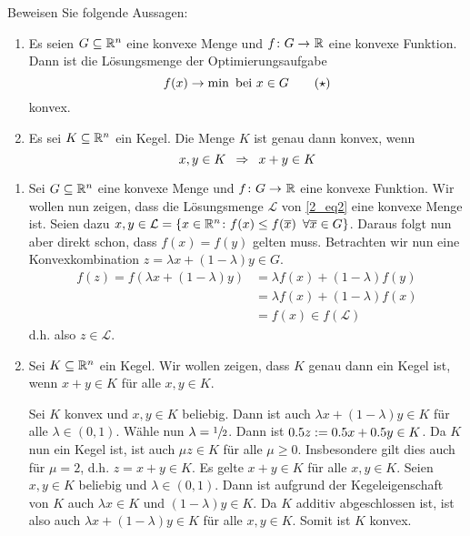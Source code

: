 \begin{exercisePage}
\pagebreak

\begin{homework}
	Beweisen Sie folgende Aussagen:
	\begin{enumerate}[leftmargin=*, nolistsep, topsep=-\parskip]
		\item Es seien $G \subseteq \mathbb{R}^n$ eine konvexe Menge und $\abb{f}{G}{\R}$ eine konvexe Funktion. Dann ist die Lösungsmenge der Optimierungsaufgabe
		\begin{equation*}
			f(x) \to \min \text{ bei } x \in G \tag{$\star$} \label{2_eq2}
		\end{equation*}
		konvex.
		\item Es sei $K \subseteq \mathbb{R}^n$ ein Kegel. Die Menge $K$ ist genau dann konvex, wenn
		\begin{equation*}
			x,y \in K \enskip \Rightarrow \enskip x+y \in K
		\end{equation*}
	\end{enumerate}
\end{homework}

\begin{enumerate}[label=(zu \alph*), leftmargin=\zulength]
	\item Sei $G \subseteq \mathbb{R}^n$ eine konvexe Menge und $\abb{f}{G}{\R}$ eine konvexe Funktion. Wir wollen nun zeigen, dass die Lösungsmenge $\mathcal{L}$ von \eqref{2_eq2} eine konvexe Menge ist. Seien dazu $x,y \in \mathcal{L} = \left\{ x \in \mathbb{R}^n \colon f(x) \le f(\overline{x}) \enskip \forall \overline{x} \in G \right\}$. Daraus folgt nun aber direkt schon, dass $f(x) = f(y)$ gelten muss. Betrachten wir nun eine Konvexkombination $z = \lambda x + (1-\lambda) y \in G$.
	\begin{align*}
		f(z) = f(\lambda x + (1-\lambda) y) 
		&= \lambda f(x) + (1-\lambda) f(y) \tag{Konvexität von $f$} \\
		&= \lambda f(x) + (1-\lambda) f(x) \tag{$f(x) = f(y)$} \\
		&= f(x) \in f(\mathcal{L})
	\end{align*}
	d.h. also $z \in \mathcal{L}$.
	\item Sei $K \subseteq \mathbb{R}^n$ ein Kegel. Wir wollen zeigen, dass $K$ genau dann ein Kegel ist, wenn $x+y \in K$ für alle $x,y \in K$.
	\begin{proof-equivalence}
		\hinrichtung Sei $K$ konvex und $x,y \in K$ beliebig. Dann ist auch $\lambda x + (1-\lambda) y \in K$ für alle $\lambda \in (0,1)$. Wähle nun $\lambda = \sfrac{1}{2}$. Dann ist $0.5 z \mathrel{:=} 0.5x + 0.5y \in K$. Da $K$ nun ein Kegel ist, ist auch $\mu z \in K$ für alle $\mu \ge 0$. Insbesondere gilt dies auch für $\mu = 2$, d.h. $z = x + y \in K$.
		\rueckrichtung Es gelte $x+y \in K$ für alle $x,y \in K$. Seien $x,y \in K$ beliebig und $\lambda \in (0,1)$. Dann ist aufgrund der Kegeleigenschaft von $K$ auch $\lambda x \in K$ und $(1-\lambda)y \in K$. Da $K$ additiv abgeschlossen ist, ist also auch $\lambda x + (1-\lambda) y \in K$ für alle $x,y \in K$. Somit ist $K$ konvex.
	\end{proof-equivalence}
\end{enumerate}


\end{exercisePage}